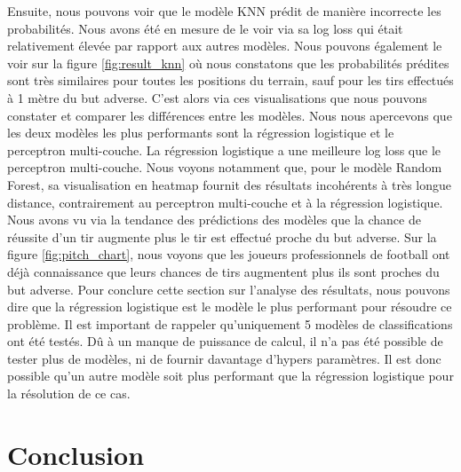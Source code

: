 \documentclass[12pt]{article}
\begin{document}
\newline\newline
Ensuite, nous pouvons voir que le modèle KNN prédit de manière incorrecte les probabilités.
Nous avons été en mesure de le voir via sa log loss qui était relativement élevée par rapport aux autres modèles.
Nous pouvons également le voir sur la figure \ref{fig:result_knn} où nous constatons que les probabilités prédites sont très similaires pour toutes les positions du terrain, sauf pour les tirs effectués à 1 mètre du but adverse.
\newline\newline
C'est alors via ces visualisations que nous pouvons constater et comparer les différences entre les modèles.
Nous nous apercevons que les deux modèles les plus performants sont la régression logistique et le perceptron multi-couche.
La régression logistique a une meilleure log loss que le perceptron multi-couche.
Nous voyons notamment que, pour le modèle Random Forest, sa visualisation en heatmap fournit des résultats incohérents à très longue distance, contrairement au perceptron multi-couche et à la régression logistique.
Nous avons vu via la tendance des prédictions des modèles que la chance de réussite d'un tir augmente plus le tir est effectué proche du but adverse.
Sur la figure \ref{fig:pitch_chart}, nous voyons que les joueurs professionnels de football ont déjà connaissance que leurs chances de tirs augmentent plus ils sont proches du but adverse.
\newline\newline
Pour conclure cette section sur l'analyse des résultats, nous pouvons dire que la régression logistique est le modèle le plus performant pour résoudre ce problème.
Il est important de rappeler qu'uniquement 5 modèles de classifications ont été testés.
Dû à un manque de puissance de calcul, il n'a pas été possible de tester plus de modèles, ni de fournir davantage d'hypers paramètres.
Il est donc possible qu'un autre modèle soit plus performant que la régression logistique pour la résolution de ce cas.
\newpage
\section{Conclusion}
\end{document}
